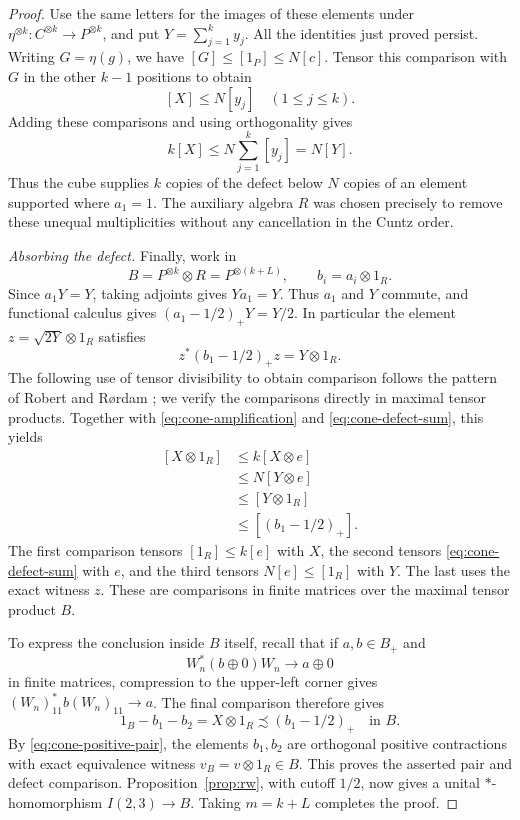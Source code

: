 \begin{proof}
Use the same letters for the images of these elements under
\(\eta^{\otimes k}:C^{\otimes k}\to P^{\otimes k}\), and put
\(Y=\sum_{j=1}^k y_j\). All the identities just proved persist.
Writing \(G=\eta(g)\), we have
\([G]\le[1_P]\le N[c]\).
Tensor this comparison with \(G\) in the other \(k-1\) positions to
obtain
\[
[X]\le N[y_j]\quad(1\le j\le k).
\]
Adding these comparisons and using orthogonality gives
\begin{equation}\label{eq:cone-defect-sum}
k[X]\le N\sum_{j=1}^k[y_j]=N[Y].
\end{equation}
Thus the cube supplies \(k\) copies of the defect below \(N\) copies of
an element supported where \(a_1=1\). The auxiliary algebra \(R\) was
chosen precisely to remove these unequal multiplicities without any
cancellation in the Cuntz order.

\emph{Absorbing the defect.}
Finally, work in
\[
B=P^{\otimes k}\otimes R=P^{\otimes(k+L)},
\qquad b_i=a_i\otimes1_R.
\]
Since \(a_1Y=Y\), taking adjoints gives \(Ya_1=Y\).
Thus \(a_1\) and \(Y\) commute, and functional calculus gives
\((a_1-1/2)_+Y=Y/2\). In particular the element
\(z=\sqrt{2Y}\otimes1_R\) satisfies
\[
z^*(b_1-1/2)_+z=Y\otimes1_R.
\]
The following use of tensor divisibility to obtain comparison follows
the pattern of Robert and R\o rdam \cite[Lemma~6.1(i)]{RR}; we verify the
comparisons directly in maximal tensor products. Together with
\eqref{eq:cone-amplification} and
\eqref{eq:cone-defect-sum}, this yields
\[
\begin{aligned}
[X\otimes1_R]
&\le k[X\otimes e]\\
&\le N[Y\otimes e]\\
&\le[Y\otimes1_R]\\
&\le[(b_1-1/2)_+].
\end{aligned}
\]
The first comparison tensors \([1_R]\le k[e]\) with \(X\), the
second tensors \eqref{eq:cone-defect-sum} with \(e\), and the third
tensors \(N[e]\le[1_R]\) with \(Y\). The last uses the exact witness
\(z\). These are comparisons in finite matrices over the maximal
tensor product \(B\).

To express the conclusion inside \(B\) itself, recall that if
\(a,b\in B_+\) and
\[
W_n^*(b\oplus0)W_n\longrightarrow a\oplus0
\]
in finite matrices, compression to the upper-left corner gives
\((W_n)_{11}^*b(W_n)_{11}\to a\).
The final comparison therefore gives
\[
1_B-b_1-b_2=X\otimes1_R\precsim(b_1-1/2)_+
\quad\text{in }B.
\]
By \eqref{eq:cone-positive-pair}, the elements \(b_1,b_2\) are
orthogonal positive contractions with exact equivalence witness
\(v_B=v\otimes1_R\in B\). This proves the asserted pair and defect
comparison. Proposition~\ref{prop:rw}, with cutoff \(1/2\),
now gives a unital \(*\)-homomorphism \(I(2,3)\to B\).
Taking \(m=k+L\) completes the proof.
\end{proof}
